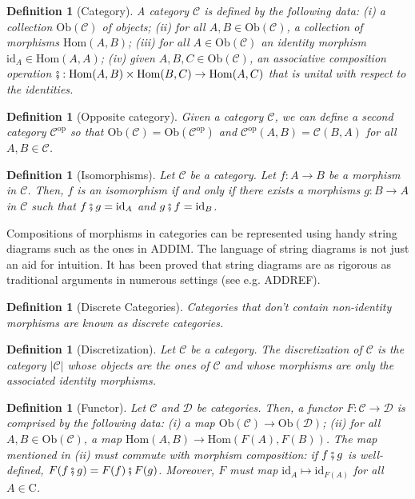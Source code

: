 \documentclass[11pt,a4paper,openright,twoside]{report}
\theoremstyle{plain}
\newtheorem{definition}[proposition]{Definition}
\theoremstyle{definition}
\begin{document}
\begin{definition}[Category]
  A category $\mathcal{C}$ is defined by the following data: (i) a collection $\mathrm{Ob}(\mathcal{C})$ of objects; (ii) for all $A, B \in \mathrm{Ob}(\mathcal{C})$, a collection of morphisms $\mathrm{Hom}(A,B)$; (iii) for all $A \in \mathrm{Ob}(\mathcal{C})$ an identity morphism $\mathrm{id}_A \in \mathrm{Hom}(A,A)$; (iv) given $A, B, C \in \mathrm{Ob}(\mathcal{C})$, an associative composition operation $\fatsemi:\mathrm{Hom}(A,B) \times \mathrm{Hom}(B,C) \to \mathrm{Hom}(A,C)$  that is unital with respect to the identities.
\end{definition}

\begin{definition}[Opposite category]
  Given a category $\mathcal{C}$, we can define a second category $\mathcal{C}^{\mathrm{op}}$ so that $\mathrm{Ob}(\mathcal{C}) = \mathrm{Ob}(\mathcal{C}^{\mathrm{op}})$ and $\mathcal{C}^{\mathrm{op}}(A,B) = \mathcal{C}(B,A)$ for all $A, B \in \mathcal{C}$.
\end{definition}

\begin{definition}[Isomorphisms]
  Let $\mathcal{C}$ be a category. Let $f:A \to B$ be a morphism in $\mathcal{C}$. Then, $f$ is an isomorphism if and only if there exists a morphisms $g: B \to A$ in $\mathcal{C}$ such that $f \fatsemi g = \mathrm{id}_A$ and $g \fatsemi f = \mathrm{id}_B$.
\end{definition}

Compositions of morphisms in categories can be represented using handy string diagrams such as the ones in ADDIM. The language of string diagrams is not just an aid for intuition. It has been proved that string diagrams are as rigorous as traditional arguments in numerous settings (see e.g. ADDREF).

\begin{definition}[Discrete Categories]
  Categories that don't contain non-identity morphisms are known as discrete categories.
\end{definition}

\begin{definition}[Discretization]
  Let $\mathcal{C}$ be a category. The discretization of $\mathcal{C}$ is the category $|\mathcal{C}|$ whose objects are the ones of $\mathcal{C}$ and whose morphisms are only the associated identity morphisms.
\end{definition}

\begin{definition}[Functor]
  Let $\mathcal{C}$ and $\mathcal{D}$ be categories. Then, a functor $F: \mathcal{C} \to \mathcal{D}$ is comprised by the following data: (i) a map $\mathrm{Ob}(\mathcal{C}) \to \mathrm{Ob}(\mathcal{D})$; (ii) for all $A, B \in \mathrm{Ob}(\mathcal{C})$, a map $\mathrm{Hom}(A,B) \to \mathrm{Hom}(F(A),F(B))$. The map mentioned in (ii) must commute with morphism composition: if $f \fatsemi g$ is well-defined, $F(f \fatsemi g) = F(f) \fatsemi F(g)$. Moreover, $F$ must map $\mathrm{id}_A \mapsto \mathrm{id}_{F(A)}$ for all $A \in \mathrm{C}$.
\end{definition}
\end{document}
